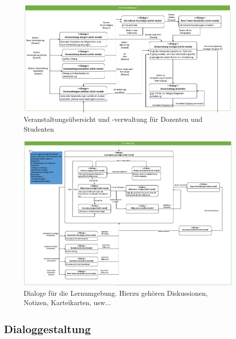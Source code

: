 \documentclass[12pt,a4paper]{article}
\begin{document}
{\begin{landscape}
\begin{figure}[H]
	\centering
	\includegraphics[width=25cm]{Bilder/Mockups/DSDVeranstaltungen.png}
	\caption{Veranstaltungsübersicht und -verwaltung für Dozenten und Studenten}
	\label{DSDVeranstaltung}
\end{figure}

\begin{figure}[H]
	\centering
	\includegraphics[width=25cm]{Bilder/Mockups/DSDLernumgebung.png}
	\caption{Dialoge für die Lernumgebung. Hierzu gehören Diskussionen, Notizen, Karteikarten, usw...}
	\label{DSDLernumgebung}
\end{figure}

\end{landscape}
\subsection{Dialoggestaltung}
\begin{figure}[H]
	\centering

\end{figure}}
\end{document}
